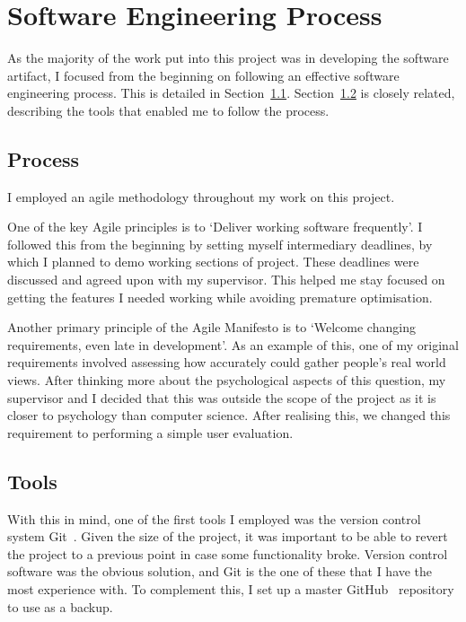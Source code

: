 \chapter{Software Engineering Process}

As the majority of the work put into this project was in developing the software artifact, I focused from the beginning on following an effective software engineering process. This is detailed in Section~\ref{proc}. Section~\ref{tool} is closely related, describing the tools that enabled me to follow the process.

\section{Process}\label{proc}
I employed an agile\cite{Agile} methodology throughout my work on this project. 

One of the key Agile principles is to `Deliver working software frequently'\cite{AgileKey}. 
I followed this from the beginning by setting myself intermediary deadlines, by which I planned to demo working sections of project. 
These deadlines were discussed and agreed upon with my supervisor. 
This helped me stay focused on getting the features I needed working while avoiding premature optimisation.

Another primary principle of the Agile Manifesto is to `Welcome changing requirements, even late in development'\cite{AgileKey}. 
As an example of this, one of my original requirements involved assessing how accurately \od{} could gather people's real world views. 
After thinking more about the psychological aspects of this question, my supervisor and I decided that this was outside the scope of the project as it is closer to psychology than computer science. 
After realising this, we changed this requirement to performing a simple user evaluation. 

\section{Tools}\label{tool}
With this in mind, one of the first tools I employed was the version control system Git~\cite{Git}.
Given the size of the project, it was important to be able to revert the project to a previous point in case some functionality broke.
Version control software was the obvious solution, and Git is the one of these that I have the most experience with. To complement this, I set up a master GitHub~\cite{GitHub} repository to use as a backup.

